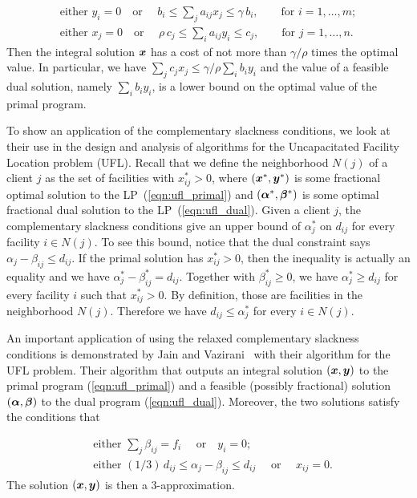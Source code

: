 \documentclass[oneside,final]{ucr}
\def\dsp{\def\baselinestretch{2.0}\large\normalsize}
\def\ssp{\def\baselinestretch{1.0}\large\normalsize}
\begin{document}
\ssp
\begin{align*}
  \text{either } y_i = 0  \quad \text{or } \quad b_i \leq \sum_{j}
  a_{ij} x_j \leq \gamma\, b_i, \qquad \text{for } i = 1,
  \ldots, m;\\
  \text{either } x_j = 0  \quad \text{or } \quad \rho\, c_j \leq
  \sum_{i}a_{ij}y_i \leq c_j, \qquad \text{for } j = 1,
  \ldots, n.
\end{align*}
\dsp
Then the integral solution $\boldsymbol{x}$ has a cost of not more
than $\gamma/\rho$ times the optimal value. In particular,
we have $\sum_{j} c_j x_j \leq \gamma/\rho \sum_{i} b_i y_i$
and the value of a feasible dual solution, namely $\sum_{i}
b_i y_i$, is a lower bound on the optimal value of the
primal program.

To show an application of the complementary slackness
conditions, we look at their use in the design and analysis
of algorithms for the Uncapacitated Facility Location
problem (UFL). Recall that we define the neighborhood $N(j)$
of a client $j$ as the set of facilities with $x_{ij}^\ast >
0$, where $(\boldsymbol{x}^\ast,\boldsymbol{y}^\ast)$ is some fractional optimal
solution to the LP~(\ref{eqn:ufl_primal}) and
$(\boldsymbol{\alpha}^\ast, \boldsymbol{\beta}^\ast)$ is some optimal fractional
dual solution to the LP~(\ref{eqn:ufl_dual}). Given a client
$j$, the complementary slackness conditions give an upper
bound of $\alpha_j^\ast$ on $d_{ij}$ for every facility
$i\in N(j)$. To see this bound, notice that the dual
constraint says $\alpha_j - \beta_{ij} \leq d_{ij}$.  If the
primal solution has $x_{ij}^\ast > 0$, then the inequality
is actually an equality and we have $\alpha_j^\ast -
\beta_{ij}^\ast = d_{ij}$. Together with $\beta_{ij}^\ast
\geq 0$, we have $\alpha_j^\ast \geq d_{ij}$ for every
facility $i$ such that $x_{ij}^\ast > 0$. By definition,
those are facilities in the neighborhood $N(j)$. Therefore
we have $d_{ij} \leq \alpha_j^\ast$ for every $i\in N(j)$.

An important application of using the relaxed complementary
slackness conditions is demonstrated by Jain and
Vazirani~\cite{JainV01} with their algorithm for the UFL
problem. Their algorithm that outputs an integral solution
$(\boldsymbol{x}, \boldsymbol{y})$ to the primal program (\ref{eqn:ufl_primal})
and a feasible (possibly fractional) solution
$(\boldsymbol{\alpha},\boldsymbol{\beta})$ to the dual program
(\ref{eqn:ufl_dual}). Moreover, the two solutions satisfy
the conditions that

\ssp
\begin{align*}
  &\text{either } \sum_{j} \beta_{ij} = f_i  \quad \text{ or
} \quad y_i = 0;\\
  &\text{either } (1/3)\, d_{ij} \leq \alpha_j - \beta_{ij}
  \leq d_{ij} \quad \text{ or } \quad x_{ij} = 0.
\end{align*}
\dsp
The solution $(\boldsymbol{x},\boldsymbol{y})$ is then a $3$-approximation.
\end{document}
